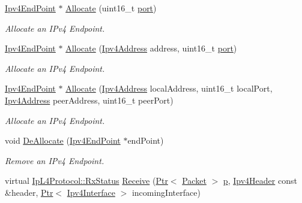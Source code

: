 \begin{DoxyCompactItemize}
\hyperlink{classns3_1_1Ipv4EndPoint}{Ipv4\+End\+Point} $\ast$ \hyperlink{classns3_1_1NscTcpL4Protocol_a03e73bb275facb267e51f8240b320996}{Allocate} (uint16\+\_\+t \hyperlink{visualizer-ideas_8txt_a21ff1c530daf8435e00048b7fc2c58e3}{port})
\begin{DoxyCompactList}\small\item\em Allocate an I\+Pv4 Endpoint. \end{DoxyCompactList}\item 
\hyperlink{classns3_1_1Ipv4EndPoint}{Ipv4\+End\+Point} $\ast$ \hyperlink{classns3_1_1NscTcpL4Protocol_a8b0d8c0999b47aa6e86a5a4791aa530e}{Allocate} (\hyperlink{classns3_1_1Ipv4Address}{Ipv4\+Address} address, uint16\+\_\+t \hyperlink{visualizer-ideas_8txt_a21ff1c530daf8435e00048b7fc2c58e3}{port})
\begin{DoxyCompactList}\small\item\em Allocate an I\+Pv4 Endpoint. \end{DoxyCompactList}\item 
\hyperlink{classns3_1_1Ipv4EndPoint}{Ipv4\+End\+Point} $\ast$ \hyperlink{classns3_1_1NscTcpL4Protocol_aff303f62c4e376e0c16c4b67e08211f2}{Allocate} (\hyperlink{classns3_1_1Ipv4Address}{Ipv4\+Address} local\+Address, uint16\+\_\+t local\+Port, \hyperlink{classns3_1_1Ipv4Address}{Ipv4\+Address} peer\+Address, uint16\+\_\+t peer\+Port)
\begin{DoxyCompactList}\small\item\em Allocate an I\+Pv4 Endpoint. \end{DoxyCompactList}\item 
void \hyperlink{classns3_1_1NscTcpL4Protocol_a8516f7e653598999b06759017e891ab4}{De\+Allocate} (\hyperlink{classns3_1_1Ipv4EndPoint}{Ipv4\+End\+Point} $\ast$end\+Point)
\begin{DoxyCompactList}\small\item\em Remove an I\+Pv4 Endpoint. \end{DoxyCompactList}\item 
virtual \hyperlink{classns3_1_1IpL4Protocol_afd3744c89902fff232e2fd45f558c80e}{Ip\+L4\+Protocol\+::\+Rx\+Status} \hyperlink{classns3_1_1NscTcpL4Protocol_a6e7e849a94635f93115ce30fdacb469d}{Receive} (\hyperlink{classns3_1_1Ptr}{Ptr}$<$ \hyperlink{classns3_1_1Packet}{Packet} $>$ \hyperlink{lte__link__budget__x2__handover__measures_8m_ac9de518908a968428863f829398a4e62}{p}, \hyperlink{classns3_1_1Ipv4Header}{Ipv4\+Header} const \&header, \hyperlink{classns3_1_1Ptr}{Ptr}$<$ \hyperlink{classns3_1_1Ipv4Interface}{Ipv4\+Interface} $>$ incoming\+Interface)

\end{DoxyCompactItemize}
